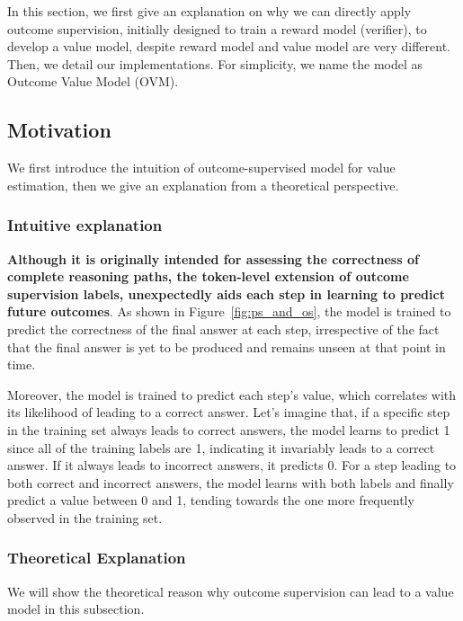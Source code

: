 \documentclass[11pt]{article}
\theoremstyle{plain}
\theoremstyle{claim}
\theoremstyle{rethinking}
\theoremstyle{researchquestion}
\theoremstyle{findings}
\theoremstyle{fact}
\theoremstyle{proper}
\theoremstyle{remark}
\begin{document}
In this section, we first give an explanation on why we can directly apply outcome supervision, initially designed to train a reward model (verifier), to develop a value model, despite reward model and value model are very different. Then, we detail our implementations. For simplicity, we name the model as Outcome Value Model (OVM).




\subsection{Motivation}
We first introduce the intuition of outcome-supervised model for value estimation, then we give an explanation from a theoretical perspective.


\subsubsection{Intuitive explanation}
\textbf{Although it is originally intended for assessing the correctness of complete reasoning paths, the token-level extension of outcome supervision labels, unexpectedly aids each step in learning to predict future outcomes}. As shown in Figure~\ref{fig:ps_and_os}, the model is trained to predict the correctness of the final answer at each step, irrespective of the fact that the final answer is yet to be produced and remains unseen at that point in time. 

Moreover, the model is trained to predict each step's value, which correlates with its likelihood of leading to a correct answer. Let's imagine that, if a specific step in the training set always leads to correct answers, the model learns to predict 1 since all of the training labels are 1, indicating it invariably leads to a correct answer. If it always leads to incorrect answers, it predicts 0. For a step leading to both correct and incorrect answers, the model learns with both labels and finally predict a value between 0 and 1, tending towards the one more frequently observed in the training set.





\subsubsection{Theoretical Explanation}
\label{sec:proof}




We will show the theoretical reason why outcome supervision can lead to a value model in this subsection. 
\end{document}
